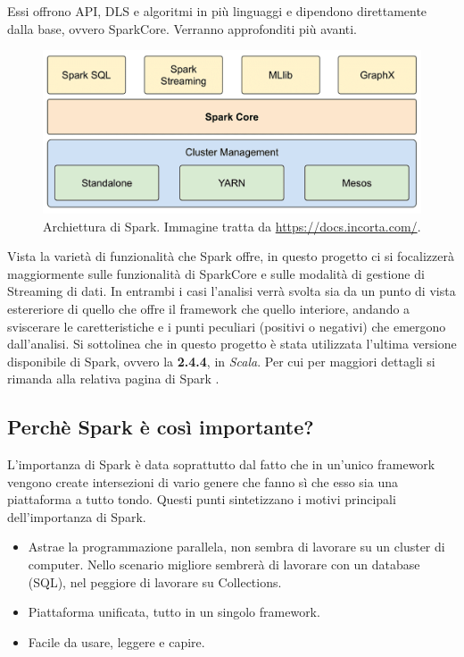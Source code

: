 \documentclass[12pt,italian]{article}
\begin{document}
Essi offrono API, DLS e algoritmi in più linguaggi e dipendono direttamente dalla base, ovvero SparkCore. Verranno approfonditi più avanti.
\begin{figure}[H]
	\centering 
	\includegraphics[width=1\linewidth]{img/sparkModules.png}
	\caption{Archiettura di Spark. Immagine tratta da \url{https://docs.incorta.com/}.}
	\label{fig:SparkModules}
\end{figure}
\par Vista la varietà di funzionalità che Spark offre, in questo progetto ci si focalizzerà maggiormente sulle funzionalità di SparkCore e sulle modalità di gestione di Streaming di dati. In entrambi i casi l'analisi verrà svolta sia da un punto di vista estereriore di quello che offre il framework che quello interiore, andando a sviscerare le caretteristiche e i punti peculiari (positivi o negativi) che emergono dall'analisi. 
\newline
Si sottolinea che in questo progetto è stata utilizzata l'ultima versione disponibile di Spark, ovvero la \textbf{2.4.4}, in \textit{Scala}. Per cui per maggiori dettagli si rimanda alla relativa pagina di Spark \cite{spark}.
\subsection{Perchè Spark è così importante?}
L'importanza di Spark è data soprattutto dal fatto che in un'unico framework vengono create intersezioni di vario genere che fanno sì che esso sia una piattaforma a tutto tondo. Questi punti sintetizzano i motivi principali dell'importanza di Spark.
\begin{itemize}
	\item Astrae la programmazione parallela, non sembra di lavorare su un cluster di computer.
	Nello scenario migliore sembrerà di lavorare con un database (SQL), nel peggiore di lavorare su Collections.
	\item Piattaforma unificata, tutto in un singolo framework.
	\item Facile da usare, leggere e capire.
\end{itemize}
\end{document}
